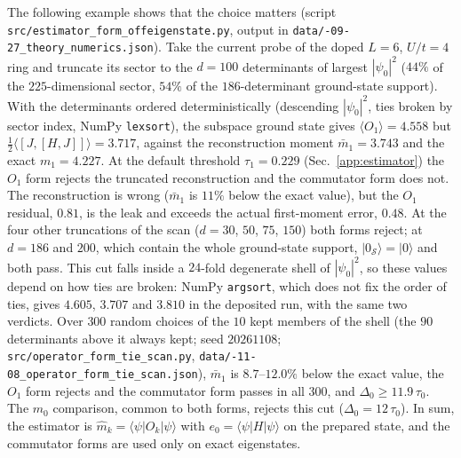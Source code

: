 \documentclass[aps,prb,onecolumn,superscriptaddress,longbibliography,floatfix]{revtex4-2}
\begin{document}
The following example shows that the choice matters (script \texttt{src/\allowbreak estimator\_form\_\allowbreak offeigenstate.py}, output in \texttt{data/-09-27\_theory\_numerics.json}). Take the current probe of the doped $L=6$, $U/t=4$ ring and truncate its sector to the $d=100$ determinants of largest $|\psi_0|^2$ ($44\%$ of the $225$-dimensional sector, $54\%$ of the $186$-determinant ground-state support). With the determinants ordered deterministically (descending $|\psi_0|^2$, ties broken by sector index, NumPy \texttt{lexsort}), the subspace ground state gives $\langle O_1\rangle=4.558$ but $\tfrac12\langle[J,[H,J]]\rangle=3.717$, against the reconstruction moment $\bar m_1=3.743$ and the exact $m_1=4.227$. At the default threshold $\tau_1=0.229$ (Sec.~\ref{app:estimator}) the $O_1$ form rejects the truncated reconstruction and the commutator form does not. The reconstruction is wrong ($\bar m_1$ is $11\%$ below the exact value), but the $O_1$ residual, $0.81$, is the leak and exceeds the actual first-moment error, $0.48$. At the four other truncations of the scan ($d=30$, $50$, $75$, $150$) both forms reject; at $d=186$ and $200$, which contain the whole ground-state support, $|0_\mathcal S\rangle=|0\rangle$ and both pass. This cut falls inside a $24$-fold degenerate shell of $|\psi_0|^2$, so these values depend on how ties are broken: NumPy \texttt{argsort}, which does not fix the order of ties, gives $4.605$, $3.707$ and $3.810$ in the deposited run, with the same two verdicts. Over $300$ random choices of the $10$ kept members of the shell (the $90$ determinants above it always kept; seed $20261108$; \texttt{src/\allowbreak operator\_form\_tie\_scan.py}, \texttt{data/-11-08\_operator\_form\_tie\_scan.json}), $\bar m_1$ is $8.7$--$12.0\%$ below the exact value, the $O_1$ form rejects and the commutator form passes in all $300$, and $\Delta_0\ge11.9\,\tau_0$. The $m_0$ comparison, common to both forms, rejects this cut ($\Delta_0=12\,\tau_0$). In sum, the estimator is $\widehat m_k=\langle\psi|O_k|\psi\rangle$ with $e_0=\langle\psi|H|\psi\rangle$ on the prepared state, and the commutator forms are used only on exact eigenstates.
\end{document}
